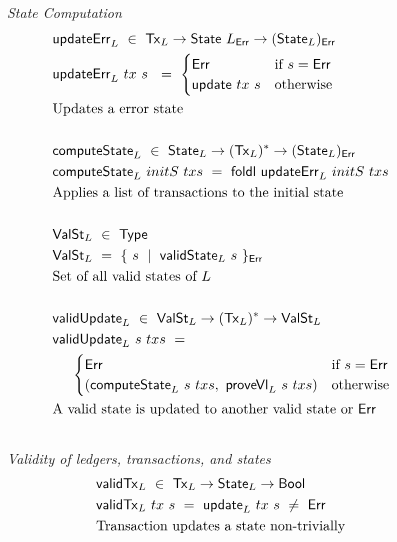 \begin{figure*}[htb]
  \emph{State Computation}
  \begin{align*}
    & \mathsf{updateErr}_L ~\in~ \mathsf{Tx}_L \to \mathsf{State}~L_{\mathsf{Err}} \to (\mathsf{State}_L)_{\mathsf{Err}} \\
    & \mathsf{updateErr}_L ~tx~s~ ~=~
        \begin{cases}
          \mathsf{Err} & \text{if~} s = \mathsf{Err} \\
          \mathsf{update}~tx~s & \text{otherwise}
        \end{cases} \\
    & \text{Updates a error state} \\~\\
    & \mathsf{computeState}_L ~\in~ \mathsf{State}_L \to (\mathsf{Tx}_L)^{*} \to (\mathsf{State}_L)_{\mathsf{Err}} \\
    & \mathsf{computeState}_L~ initS ~txs ~=~
        \mathsf{foldl}~\mathsf{updateErr}_L~initS~txs \\
    & \text{Applies a list of transactions to the initial state} \\~\\
    & \mathsf{ValSt}_L ~\in~ \mathsf{Type} \\
    & \mathsf{ValSt}_L ~=~
        \{ ~s~ \mid ~\mathsf{validState}_L~s~\}_{\mathsf{Err}} \\
    & \text{Set of all valid states of $L$} \\~\\
    & \mathsf{validUpdate}_L ~\in~ \mathsf{ValSt}_L \to (\mathsf{Tx}_L)^{*} \to \mathsf{ValSt}_L\\
    & \mathsf{validUpdate}_L~s~txs ~=~\\
        &~~~~\begin{cases}
          \mathsf{Err} & \text{if~} s = \mathsf{Err} \\
          (\mathsf{computeState}_L~s~txs,~\mathsf{proveVl}_L~s~txs) & \text{otherwise}
        \end{cases} \\
    & \text{A valid state is updated to another valid state or $\mathsf{Err}$} \\~\\
  \end{align*}
  \emph{Validity of ledgers, transactions, and states}
  \begin{align*}
    & \fun{validTx}_L ~\in~ \type{Tx}_L \to \type{State}_L \to \Bool \\
    & \fun{validTx}_L~tx~s~ = ~\fun{update}_L ~tx~s~ \neq ~\Err \\
    & \text{Transaction updates a state non-trivially} \\~\\

\end{align*}
\end{figure*}

